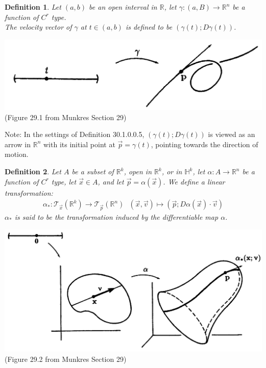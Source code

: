 \documentclass[15pt]{book}
\theoremstyle{break}
\theoremstyle{break}
\newtheorem{defn}{Definition}[corL]
\newcommand{\R}{\mathbb{R}}
\newcommand{\T}{\mathcal{T}}
\newcommand{\note}{\color{red}Note: \color{black}}
\begin{document}
\begin{defn}
Let $(a,b)$ be an open interval in $\R$, let $\gamma:(a,B) \to \R^n$ be a function of $C^r$ type. \\
The velocity vector of $\gamma$ at $t \in (a,b)$ is defined to be $(\gamma(t); D\gamma(t))$. 
\end{defn}

\begin{center}
\includegraphics[scale=0.3]{1tangent.png}\\
(Figure 29.1 from Munkres Section 29)
\end{center}

\note In the settings of Definition 30.1.0.0.5, $(\gamma(t); D\gamma(t))$ is viewed as an arrow in $\R^n$ with its initial point at $\vec{p} = \gamma(t)$, pointing towards the direction of motion. \\

\begin{defn}
Let $A$ be a subset of $\R^k$, open in $\R^k$, or in $\mathbb{H}^k$, let $\alpha:A \to \R^n$ be a function of $C^r$ type, let $\vec{x} \in A$, and let $\vec{p} = \alpha(\vec{x})$. We define a linear transformation:
\begin{align*}
\alpha_*: \T_{\vec{x}}(\R^k) \to \T_{\vec{p}}(\R^n) \ \ \ (\vec{x},\vec{v})\mapsto (\vec{p}; D\alpha(\vec{x})\cdot \vec{v})
\end{align*}
$\alpha_*$ is said to be the transformation induced by the differentiable map $\alpha$. 
\end{defn}

\begin{center}
\includegraphics[scale=0.29]{ntangent.png}\\
(Figure 29.2 from Munkres Section 29)
\end{center}
\end{document}
